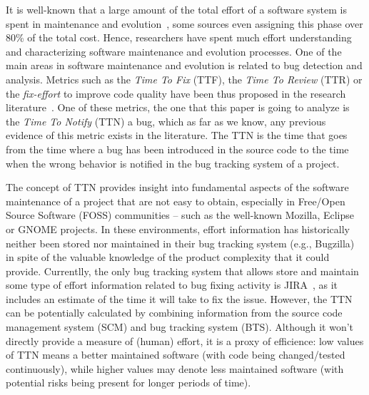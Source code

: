 \documentclass[10pt, conference]{IEEEtran}
\begin{document}
It is well-known that a large amount of the total effort of a software system is spent in maintenance and evolution~\cite{tassey2002economic}, some sources even assigning this phase over 80\% of the total cost. Hence, researchers have spent much effort understanding and characterizing software maintenance and evolution processes. One of the main areas in software maintenance and evolution is related to bug detection and analysis. Metrics such as the \emph{Time To Fix} (TTF), the \emph{Time To Review} (TTR) or the \emph{fix-effort} to improve code quality have been thus proposed in the research literature~\cite{kim2006long}\cite{mockus2002two}. One of these metrics, the one that this paper is going to analyze is the \emph{Time To Notify} (TTN) a bug, which as far as we know, any previous evidence of this metric exists in the literature. The TTN is the time that goes from the time where a bug has been introduced in the source code to the time when the wrong behavior is notified in the bug tracking system of a project. 

The concept of TTN provides insight into fundamental aspects of the software maintenance of a project that are not easy to obtain, especially in Free/Open Source Software (FOSS) communities -- such as the well-known Mozilla, Eclipse or GNOME projects. In these environments, effort information has historically neither been stored nor maintained in their bug tracking system (e.g., Bugzilla) in spite of the valuable knowledge of the product complexity that it  could provide. Currentlly, the only bug tracking system that allows store and maintain some type of effort information related to bug fixing activity is JIRA~\cite{weiss2007long}, as it includes an estimate of the time it will take to fix the issue. However, the TTN can be potentially calculated by combining information from the source code management system (SCM) and bug tracking system (BTS). Although it won't directly provide a measure of (human) effort, it is a proxy of efficience: low values of TTN means a better maintained software (with code being changed/tested continuously), while higher values may denote less maintained software (with potential risks being present for longer periods of time).
\end{document}
